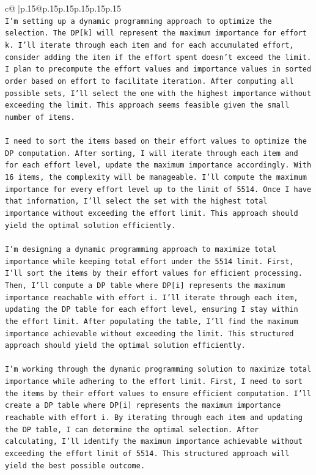 \documentclass{article}
\begin{document}
{\begin{supertabular}{c@{$\;$}|p{.15\linewidth}@{}p{.15\linewidth}p{.15\linewidth}p{.15\linewidth}p{.15\linewidth}p{.15\linewidth}}
{{{\\ 
\texttt{I’m setting up a dynamic programming approach to optimize the selection. The DP{[}k{]} will represent the maximum importance for effort k. I’ll iterate through each item and for each accumulated effort, consider adding the item if the effort spent doesn’t exceed the limit. I plan to precompute the effort values and importance values in sorted order based on effort to facilitate iteration. After computing all possible sets, I’ll select the one with the highest importance without exceeding the limit. This approach seems feasible given the small number of items.} \\
\\ 
\texttt{I need to sort the items based on their effort values to optimize the DP computation. After sorting, I will iterate through each item and for each effort level, update the maximum importance accordingly. With 16 items, the complexity will be manageable. I’ll compute the maximum importance for every effort level up to the limit of 5514. Once I have that information, I’ll select the set with the highest total importance without exceeding the effort limit. This approach should yield the optimal solution efficiently.} \\
\\ 
\texttt{I’m designing a dynamic programming approach to maximize total importance while keeping total effort under the 5514 limit. First, I’ll sort the items by their effort values for efficient processing. Then, I’ll compute a DP table where DP{[}i{]} represents the maximum importance reachable with effort i. I’ll iterate through each item, updating the DP table for each effort level, ensuring I stay within the effort limit. After populating the table, I’ll find the maximum importance achievable without exceeding the limit. This structured approach should yield the optimal solution efficiently.} \\
\\ 
\texttt{I’m working through the dynamic programming solution to maximize total importance while adhering to the effort limit. First, I need to sort the items by their effort values to ensure efficient computation. I’ll create a DP table where DP{[}i{]} represents the maximum importance reachable with effort i. By iterating through each item and updating the DP table, I can determine the optimal selection. After calculating, I’ll identify the maximum importance achievable without exceeding the effort limit of 5514. This structured approach will yield the best possible outcome.} \\
}}}
\end{supertabular}}
\end{document}
